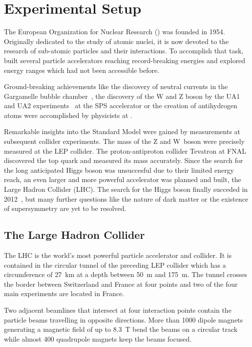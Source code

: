 
\chapter{Experimental Setup}
\label{sec:experimental_setup}

The European Organization for Nuclear Research (\CERN) was founded in 1954.
Originally dedicated to the study of atomic nuclei, it is now devoted to the
research of sub-atomic particles and their interactions. To accomplish that
task, \CERN built several particle accelerators reaching record-breaking
energies and explored energy ranges which had not been accessible before.

Ground-breaking achievements like the discovery of neutral currents in the
Gargamelle bubble chamber~\cite{Hasert:1973ff}, the discovery of the W and Z
boson by the UA1 and UA2 experiments~\cite{Arnison:1983rp} at the SPS
accelerator or the creation of antihydrogen atoms were accomplished by physicists at
\CERN.

Remarkable insights into the Standard Model were gained by measurements at
subsequent collider experiments. The mass of the Z and W~boson were precisely
measured at the LEP collider. The proton-antiproton collider Tevatron at FNAL
discovered the top quark and measured its mass accurately. Since the search
for the long anticipated Higgs boson was unsuccesful due to their limited energy
reach, an even larger and more powerful accelerator was planned and built, the
Large Hadron Collider (LHC). The search for the Higgs boson finally succeded in
2012~\cite{Chatrchyan:2012xdj,Aad:2012tfa}, but many further questions like the
nature of dark matter or the existence of supersymmetry are yet to be resolved.

\section{The Large Hadron Collider}

The LHC is the world's most powerful particle accelerator and collider. It
is contained in the circular tunnel of the preceding LEP collider which has a
circumference of \SI{27}{\kilo \meter} at a depth between \SI{50}{\meter} and
\SI{175}{\meter}.  The tunnel crosses the border between Switzerland and France
at four points and two of the four main experiments are located in France. 

Two adjacent beamlines that intersect at four interaction points contain the
particle beams travelling in opposite directions. More than 1000 dipole magnets
generating a magnetic field of up to \SI{8.3}{\tesla} bend the beams on
a circular track while almost 400 quadrupole magnets keep the beams focused. 

